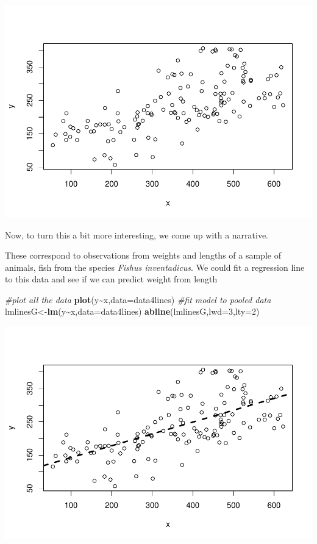 \documentclass[
]{book}
\newenvironment{Shaded}{\begin{snugshade}}{\end{snugshade}}
\newcommand{\AttributeTok}[1]{\textcolor[rgb]{0.13,0.29,0.53}{#1}}
\newcommand{\CommentTok}[1]{\textcolor[rgb]{0.56,0.35,0.01}{\textit{#1}}}
\newcommand{\DecValTok}[1]{\textcolor[rgb]{0.00,0.00,0.81}{#1}}
\newcommand{\FunctionTok}[1]{\textcolor[rgb]{0.13,0.29,0.53}{\textbf{#1}}}
\newcommand{\NormalTok}[1]{#1}
\newcommand{\OtherTok}[1]{\textcolor[rgb]{0.56,0.35,0.01}{#1}}
\newcommand{\SpecialCharTok}[1]{\textcolor[rgb]{0.81,0.36,0.00}{\textbf{#1}}}
\begin{document}
\includegraphics{ECOMODbook_files/figure-latex/a7.9-1.pdf}

Now, to turn this a bit more interesting, we come up with a narrative.

These correspond to observations from weights and lengths of a sample of animals, fish from the species \emph{Fishus inventadicus}. We could fit a regression line to this data and see if we can predict weight from length

\begin{Shaded}
\begin{Highlighting}[]
\CommentTok{\#plot all the data}
\FunctionTok{plot}\NormalTok{(y}\SpecialCharTok{\textasciitilde{}}\NormalTok{x,}\AttributeTok{data=}\NormalTok{data4lines)}
\CommentTok{\#fit model to pooled data}
\NormalTok{lmlinesG}\OtherTok{\textless{}{-}}\FunctionTok{lm}\NormalTok{(y}\SpecialCharTok{\textasciitilde{}}\NormalTok{x,}\AttributeTok{data=}\NormalTok{data4lines)}
\FunctionTok{abline}\NormalTok{(lmlinesG,}\AttributeTok{lwd=}\DecValTok{3}\NormalTok{,}\AttributeTok{lty=}\DecValTok{2}\NormalTok{)}
\end{Highlighting}
\end{Shaded}

\includegraphics{ECOMODbook_files/figure-latex/a7.10-1.pdf}
\end{document}
